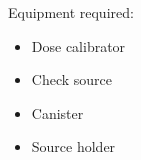 Equipment required:

\begin{itemize}
    \item Dose calibrator
    \item Check source
    \item Canister
    \item Source holder
\end{itemize}
